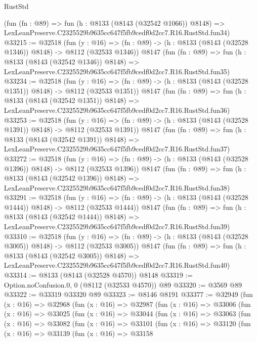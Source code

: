\begin{lexlean}{RustStd}
\begin{coremodule}
    (fun (fn : @89) =>
    fun (h : @8133 (@8143 (@32542 @1066)) @8148) =>
    LexLeanPreserve.C2325529b9635cc647f5fb9cedf0d2cc7.R16.RustStd.fun34)
@33215 := @32518
    (fun (y : @16) =>
    (fn : @89) -> (h : @8133 (@8143 (@32528 @1346)) @8148) -> @8112 (@32533 @1346))
    @8147
    (fun (fn : @89) =>
    fun (h : @8133 (@8143 (@32542 @1346)) @8148) =>
    LexLeanPreserve.C2325529b9635cc647f5fb9cedf0d2cc7.R16.RustStd.fun35)
@33234 := @32518
    (fun (y : @16) =>
    (fn : @89) -> (h : @8133 (@8143 (@32528 @1351)) @8148) -> @8112 (@32533 @1351))
    @8147
    (fun (fn : @89) =>
    fun (h : @8133 (@8143 (@32542 @1351)) @8148) =>
    LexLeanPreserve.C2325529b9635cc647f5fb9cedf0d2cc7.R16.RustStd.fun36)
@33253 := @32518
    (fun (y : @16) =>
    (fn : @89) -> (h : @8133 (@8143 (@32528 @1391)) @8148) -> @8112 (@32533 @1391))
    @8147
    (fun (fn : @89) =>
    fun (h : @8133 (@8143 (@32542 @1391)) @8148) =>
    LexLeanPreserve.C2325529b9635cc647f5fb9cedf0d2cc7.R16.RustStd.fun37)
@33272 := @32518
    (fun (y : @16) =>
    (fn : @89) -> (h : @8133 (@8143 (@32528 @1396)) @8148) -> @8112 (@32533 @1396))
    @8147
    (fun (fn : @89) =>
    fun (h : @8133 (@8143 (@32542 @1396)) @8148) =>
    LexLeanPreserve.C2325529b9635cc647f5fb9cedf0d2cc7.R16.RustStd.fun38)
@33291 := @32518
    (fun (y : @16) =>
    (fn : @89) -> (h : @8133 (@8143 (@32528 @1444)) @8148) -> @8112 (@32533 @1444))
    @8147
    (fun (fn : @89) =>
    fun (h : @8133 (@8143 (@32542 @1444)) @8148) =>
    LexLeanPreserve.C2325529b9635cc647f5fb9cedf0d2cc7.R16.RustStd.fun39)
@33310 := @32518
    (fun (y : @16) =>
    (fn : @89) -> (h : @8133 (@8143 (@32528 @3005)) @8148) -> @8112 (@32533 @3005))
    @8147
    (fun (fn : @89) =>
    fun (h : @8133 (@8143 (@32542 @3005)) @8148) =>
    LexLeanPreserve.C2325529b9635cc647f5fb9cedf0d2cc7.R16.RustStd.fun40)
@33314 := @8133 (@8143 (@32528 @4570)) @8148
@33319 := Option.noConfusion.{0, 0} (@8112 (@32533 @4570)) @89
@33320 := @3569 @89
@33322 := @33319 @33320 @89
@33323 := @8146 @8191
@33377 := @32949
    (fun (x : @16) =>
    @32968
      (fun (x : @16) =>
      @32987
        (fun (x : @16) =>
        @33006
          (fun (x : @16) =>
          @33025
            (fun (x : @16) =>
            @33044
              (fun (x : @16) =>
              @33063
                (fun (x : @16) =>
                @33082
                  (fun (x : @16) =>
                  @33101
                    (fun (x : @16) =>
                    @33120
                      (fun (x : @16) =>
                      @33139
                        (fun (x : @16) =>
                        @33158

\end{coremodule}
\end{lexlean}
